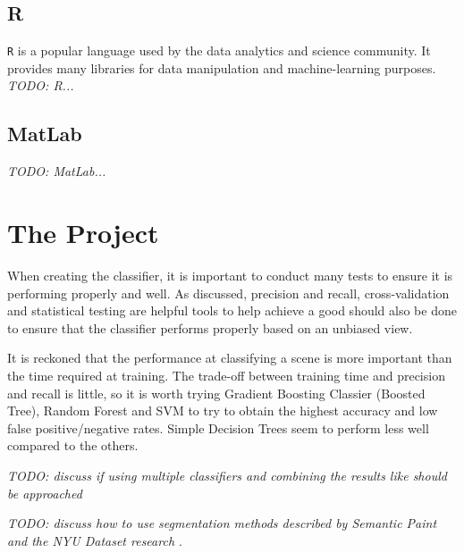 \documentclass[lit_review.tex]{subfiles}
\begin{document}
\subsection{R}
\texttt{R} is a popular language used by the data analytics and science community. It provides many libraries for data manipulation and machine-learning purposes. 
\textit{TODO: R...}

\subsection{MatLab}
\textit{TODO: MatLab...}
\newpage

\section{The Project}
When creating the classifier, it is important to conduct many tests to ensure it is performing properly and well. As discussed, precision and recall, cross-validation and statistical testing are helpful tools to help achieve a good should also be done to ensure that the classifier performs properly based on an unbiased view. 

It is reckoned that the performance at classifying a scene is more important than the time required at training. The trade-off between training time and precision and recall is little, so it is worth trying Gradient Boosting Classier (Boosted Tree), Random Forest and SVM to try to obtain the highest accuracy and low false positive/negative rates. Simple Decision Trees seem to perform less well compared to the others. 

\textit{TODO: discuss if using multiple classifiers and combining the results like \cite{forestry} should be approached}

\textit{TODO: discuss how to use segmentation methods described by Semantic Paint \cite{semantic-paint} and the NYU Dataset research \cite{nyu-dataset}}.



%
%
\end{document}
